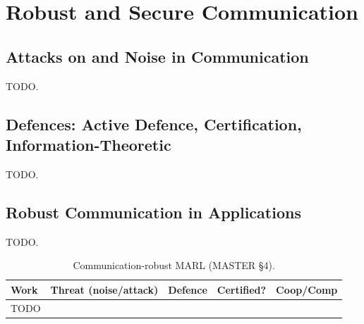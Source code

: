\section{Robust and Secure Communication}
\label{sec:comm}

\subsection{Attacks on and Noise in Communication}
TODO.

\subsection{Defences: Active Defence, Certification, Information-Theoretic}
TODO.

\subsection{Robust Communication in Applications}
TODO.

\begin{table}[t]\centering\footnotesize
\caption{Communication-robust MARL (MASTER \S4).}
\label{tab:comm}
\begin{tabular}{lllll}
\toprule
Work & Threat (noise/attack) & Defence & Certified? & Coop/Comp \\
\midrule
TODO & & & & \\
\bottomrule
\end{tabular}
\end{table}

